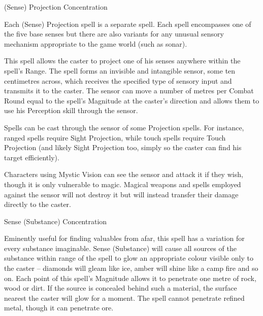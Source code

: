\begin{rpg-spell}
{(Sense) Projection}
{Concentration}

Each (Sense) Projection spell is a separate spell. Each spell encompasses one of the five base senses but there are also variants for any unusual sensory mechanism appropriate to the game world (such as sonar). 

This spell allows the caster to project one of his senses anywhere within the spell’s Range. The spell forms an invisible and intangible sensor, some ten centimetres across, which receives the specified type of sensory input and transmits it to the caster. The sensor can move a number of metres per Combat Round equal to the spell’s Magnitude at the caster’s direction and allows them to use his Perception skill through the sensor. 

Spells can be cast through the sensor of some Projection spells. For instance, ranged spells require Sight Projection, while touch spells require Touch Projection (and likely Sight Projection too, simply so the caster can find his target efficiently). 

Characters using Mystic Vision can see the sensor and attack it if they wish, though it is only vulnerable to magic. Magical weapons and spells employed against the sensor will not destroy it but will instead transfer their damage directly to the caster.
\end{rpg-spell}


\begin{rpg-spell}
{Sense (Substance)}
{Concentration}

Eminently useful for finding valuables from afar, this spell has a variation for every substance imaginable. Sense (Substance) will cause all sources of the substance within range of the spell to glow an appropriate colour visible only to the caster – diamonds will gleam like ice, amber will shine like a camp fire and so on. Each point of this spell’s Magnitude allows it to penetrate one metre of rock, wood or dirt. If the source is concealed behind such a material, the surface nearest the caster will glow for a moment. The spell cannot penetrate refined metal, though it can penetrate ore. 
\end{rpg-spell}


